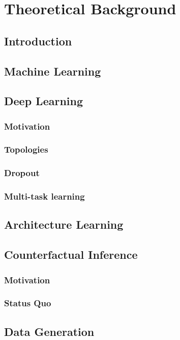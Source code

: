 %

\chapter{\label{ch:2-background}Theoretical Background} 


\section{Introduction}

\section{Machine Learning}

\section{Deep Learning}
\subsection{Motivation}
\subsection{Topologies}
\subsection{Dropout}
\subsection{Multi-task learning}

\section{Architecture Learning}

\section{Counterfactual Inference}
\subsection{Motivation}
\subsection{Status Quo}

\section{Data Generation}
